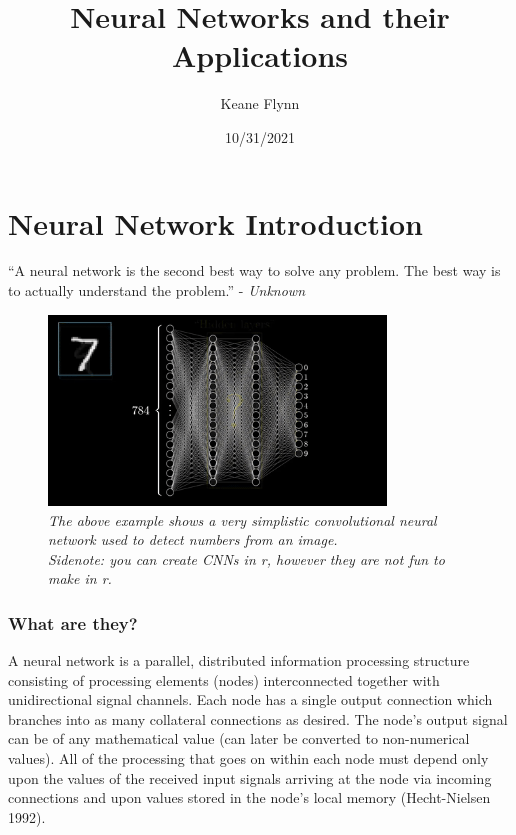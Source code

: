 \documentclass[
]{article}
\title{Neural Networks and their Applications}
\author{Keane Flynn}
\date{10/31/2021}
\begin{document}
\maketitle

\hypertarget{neural-network-introduction}{%
\section{Neural Network
Introduction}\label{neural-network-introduction}}

``A neural network is the second best way to solve any problem. The best
way is to actually understand the problem.'' - \emph{Unknown}

\begin{figure}
\centering
\includegraphics[width=0.8\textwidth,height=\textheight]{media/neuralNet.gif}
\caption{\emph{The above example shows a very simplistic convolutional
neural network used to detect numbers from an image.\\
Sidenote: you can create CNNs in r, however they are not fun to make in
r.}}
\end{figure}

\hypertarget{what-are-they}{%
\subsubsection{What are they?}\label{what-are-they}}

A neural network is a parallel, distributed information processing
structure consisting of processing elements (nodes) interconnected
together with unidirectional signal channels. Each node has a single
output connection which branches into as many collateral connections as
desired. The node's output signal can be of any mathematical value (can
later be converted to non-numerical values). All of the processing that
goes on within each node must depend only upon the values of the
received input signals arriving at the node via incoming connections and
upon values stored in the node's local memory (Hecht-Nielsen 1992).
\end{document}
